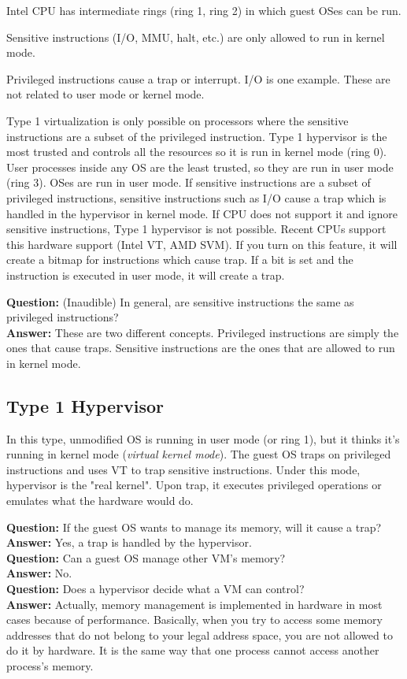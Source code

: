 \documentclass[twoside]{article}
\newcommand{\que}[1]{\textbf{Question:} #1\\}
\newcommand{\ans}[1]{\textbf{Answer:} #1\\}
\begin{document}
Intel CPU has intermediate rings (ring 1, ring 2) in which guest OSes can be run.

Sensitive instructions (I/O, MMU, halt, etc.) are only allowed to run in kernel mode.

Privileged instructions cause a trap or interrupt. I/O is one example. These are not related to user mode or kernel mode.

Type 1 virtualization is only possible on processors where the sensitive instructions are a subset of the privileged instruction. Type 1 hypervisor is the most trusted and controls all the resources so it is run in kernel mode (ring 0). User processes inside any OS are the least trusted, so they are run in user mode (ring 3). OSes are run in user mode. If sensitive instructions are a subset of privileged instructions, sensitive instructions such as I/O cause a trap which is handled in the hypervisor in kernel mode. If CPU does not support it and ignore sensitive instructions, Type 1 hypervisor is not possible. Recent CPUs support this hardware support (Intel VT, AMD SVM). If you turn on this feature, it will create a bitmap for instructions which cause trap. If a bit is set and the instruction is executed in user mode, it will create a trap.

\que{(Inaudible) In general, are sensitive instructions the same as privileged instructions?}
\ans{These are two different concepts. Privileged instructions are simply the ones that cause traps. Sensitive instructions are the ones that are allowed to run in kernel mode.}

\subsection{Type 1 Hypervisor}

In this type, unmodified OS is running in user mode (or ring 1), but it thinks it's running in kernel mode (\textit{virtual kernel mode}). The guest OS traps on privileged instructions and uses VT to trap sensitive instructions. Under this mode, hypervisor is the "real kernel". Upon trap, it executes privileged operations or emulates what the hardware would do.

\que{If the guest OS wants to manage its memory, will it cause a trap?}
\ans{Yes, a trap is handled by the hypervisor.}

\que{Can a guest OS manage other VM's memory?}
\ans{No.}

\que{Does a hypervisor decide what a VM can control?}
\ans{Actually, memory management is implemented in hardware in most cases because of performance. Basically, when you try to access some memory addresses that do not belong to your legal address space, you are not allowed to do it by hardware. It is the same way that one process cannot access another process's memory.}
\end{document}
